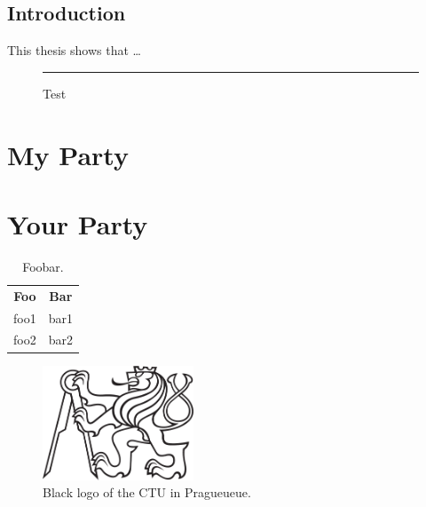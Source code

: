 \documentclass[twoside]{ctuthesis}
\theoremstyle{plain}
\theoremstyle{definition}
\theoremstyle{note}
\begin{document}
\maketitle

\chapter{Introduction}

This thesis shows that \ldots

\begin{figure}[!h]
	\rule{3cm}{3cm}
	\caption{Test}
\end{figure}

\part{My Party}






\part{Your Party}

\blindmathtrue

\blinddocument

\begin{table}
	\begin{ctucolortab}
		\begin{tabular}{cc}
			\bfseries Foo & \bfseries Bar \\\Midrule
			foo1          & bar1          \\
			foo2          & bar2
		\end{tabular}
	\end{ctucolortab}
	\caption{Foobar.}
	\label{tab:foobar}
\end{table}

\begin{figure}
	\includegraphics[width=0.4\textwidth]{ctu_logo_black}
	\caption{Black logo of the CTU in Pragueueue.}
\end{figure}
\end{document}
